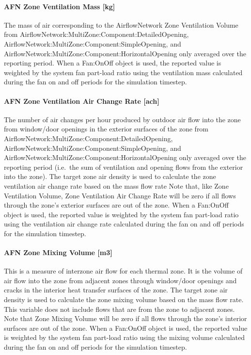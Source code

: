 \paragraph{AFN Zone Ventilation Mass {[}kg{]}}\label{afn-zone-ventilation-mass-kg}

The mass of air corresponding to the AirflowNetwork Zone Ventilation Volume from AirflowNetwork:MultiZone:Component:DetailedOpening, AirflowNetwork:MultiZone:Component:SimpleOpening, and AirflowNetwork:MultiZone:Component:HorizontalOpening only averaged over the reporting period. When a Fan:OnOff object is used, the reported value is weighted by the system fan part-load ratio using the ventilation mass calculated during the fan on and off periods for the simulation timestep.

\paragraph{AFN Zone Ventilation Air Change Rate {[}ach{]}}\label{afn-zone-ventilation-air-change-rate-ach}

The number of air changes per hour produced by outdoor air flow into the zone from window/door openings in the exterior surfaces of the zone from AirflowNetwork:MultiZone:Component:DetailedOpening, AirflowNetwork:MultiZone:Component:SimpleOpening, and AirflowNetwork:MultiZone:Component:HorizontalOpening only averaged over the reporting period (i.e.~the sum of ventilation and opening flows from the exterior into the zone). The target zone air density is used to calculate the zone ventilation air change rate based on the mass flow rate Note that, like Zone Ventilation Volume, Zone Ventilation Air Change Rate will be zero if all flows through the zone's exterior surfaces are out of the zone. When a Fan:OnOff object is used, the reported value is weighted by the system fan part-load ratio using the ventilation air change rate calculated during the fan on and off periods for the simulation timestep.

\paragraph{AFN Zone Mixing Volume {[}m3{]}}\label{afn-zone-mixing-volume-m3}

This is a measure of interzone air flow for each thermal zone. It is the volume of air flow into the zone from adjacent zones through window/door openings and cracks in the interior heat transfer surfaces of the zone. The target zone air density is used to calculate the zone mixing volume based on the mass flow rate. This variable does not include flows that are from the zone to adjacent zones. Note that Zone Mixing Volume will be zero if all flows through the zone's interior surfaces are out of the zone. When a Fan:OnOff object is used, the reported value is weighted by the system fan part-load ratio using the mixing volume calculated during the fan on and off periods for the simulation timestep.

